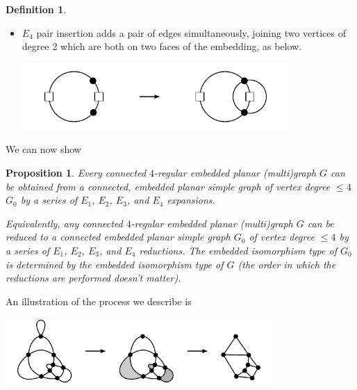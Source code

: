 \documentclass[amsmath,secnumarabic,floatfix,amssymb,nofootinbib,nobibnotes,letterpaper,11pt,tightenlines,showkeys]{revtex4}
\newtheorem{proposition}[theorem]{Proposition}
\theoremstyle{definition}
\newtheorem{definition}[theorem]{Definition}
\newcommand{\loopinsert}{E_1}
\newcommand{\edgedouble}{E_2}
\newcommand{\cutedgedouble}{E_3}
\newcommand{\pairinsert}{E_4}
\let\mgp=\marginpar \marginparwidth18mm \marginparsep1mm
\def\marginpar#1{\mgp{\raggedright\tiny #1}}
\let\lbl=\label
\def\label#1{\lbl{#1}\ifinner\else\marginpar{\ref{#1} #1}\ignorespaces\fi}
\begin{document}
\begin{definition}
\begin{itemize}
\item $\pairinsert$ pair insertion adds a pair of edges simultaneously, joining two vertices of degree 2 which are both on two faces of the embedding, as below.
  \begin{center}
    \includegraphics[width=4in]{pair-insertion}
  \end{center}
\end{itemize}
\end{definition}

We can now show

\begin{proposition}
Every connected $4$-regular embedded planar (multi)graph $G$ can be obtained from a connected, embedded planar simple graph of vertex degree $\leq 4$ $G_0$ by a series of $\loopinsert$, $\edgedouble$, $\cutedgedouble$, and $\pairinsert$ expansions.

Equivalently, any connected $4$-regular embedded planar (multi)graph $G$ can be reduced to a connected embedded planar simple graph $G_0$ of vertex degree $\leq 4$ by a series of $\loopinsert$, $\edgedouble$, $\cutedgedouble$, and $\pairinsert$ reductions. The embedded isomorphism type of $G_0$ is determined by the  embedded isomorphism type of $G$ (the order in which the reductions are performed doesn't matter).
\label{prop:reduce}
\end{proposition}

An illustration of the process we describe is
\begin{center}
\includegraphics[width=4in]{expansion-from-simple-graph}
\end{center}
\end{document}
